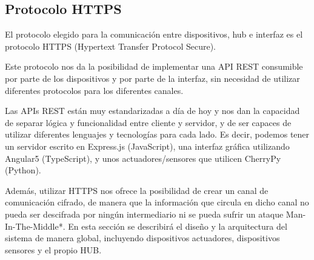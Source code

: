 \subsection{Protocolo HTTPS}
El protocolo elegido para la comunicación entre dispositivos, hub e interfaz es el protocolo HTTPS (Hypertext Transfer Protocol Secure).
\par
Este protocolo nos da la posibilidad de implementar una API REST consumible por parte de los dispositivos y por parte de la interfaz,
sin necesidad de utilizar diferentes protocolos para los diferentes canales.
\par
Las APIs REST están muy estandarizadas a día de hoy y nos dan la capacidad de separar lógica y funcionalidad entre cliente y servidor, y de ser capaces
de utilizar diferentes lenguajes y tecnologías para cada lado. Es decir, podemos tener un servidor escrito en Express.js (JavaScript), una interfaz 
gráfica utilizando Angular5 (TypeScript), y unos actuadores/sensores que utilicen CherryPy (Python).
\par
Además, utilizar HTTPS nos ofrece la posibilidad de crear un canal de comunicación cifrado, de manera que la información que circula en dicho 
canal no pueda ser descifrada por ningún intermediario ni se pueda sufrir un ataque Man-In-The-Middle*.
En esta sección se describirá el diseño y la arquitectura del sistema de manera global, incluyendo dispositivos actuadores, 
dispositivos sensores y el propio HUB.
